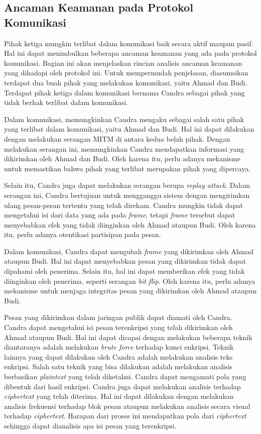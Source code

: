 \subsection{Ancaman Keamanan pada Protokol Komunikasi}
\label{sec:ancaman-keamanan}

Pihak ketiga mungkin terlibat dalam komunikasi baik secara aktif maupun pasif. Hal ini dapat menimbulkan beberapa ancaman keamanan yang ada pada protokol komunikasi. Bagian ini akan menjelaskan rincian analisis ancaman keamanan yang dihadapi oleh protokol ini. Untuk mempermudah penjelasan, diasumsikan terdapat dua buah pihak yang melakukan komunikasi, yaitu Ahmad dan Budi. Terdapat pihak ketiga dalam komunikasi bernama Candra sebagai pihak yang tidak berhak terlibat dalam komunikasi. 

Dalam komunikasi, memungkinkan Candra mengaku sebagai salah satu pihak yang terlibat dalam komunikasi, yaitu Ahmad dan Budi. Hal ini dapat dilakukan dengan melakukan serangan MITM di antara kedua belah pihak. Dengan melakukan serangan ini, memungkinkan Candra mendapatkan informasi yang dikirimkan oleh Ahmad dan Budi. Oleh karena itu, perlu adanya mekanisme untuk memastikan bahwa pihak yang terlibat merupakan pihak yang dipercaya.

Selain itu, Candra juga dapat melakukan serangan berupa \emph{replay attack}. Dalam serangan ini, Candra bertujuan untuk mengganggu sistem dengan mengirimkan ulang pesan-pesan tertentu yang telah direkam. Candra mungkin tidak dapat mengetahui isi dari data yang ada pada \emph{frame}, tetapi \emph{frame} tersebut dapat menyebabkan efek yang tidak diinginkan oleh Ahmad ataupun Budi. Oleh karena itu, perlu adanya otentikasi partisipan pada pesan.

Dalam komunikasi, Candra dapat mengubah \emph{frame} yang dikirimkan oleh Ahmad ataupun Budi. Hal ini dapat menyebabkan pesan yang dikirimkan tidak dapat dipahami oleh penerima. Selain itu, hal ini dapat memberikan efek yang tidak diinginkan oleh penerima, seperti serangan \emph{bit flip}. Oleh karena itu, perlu adanya mekanisme untuk menjaga integritas pesan yang dikirimkan oleh Ahmad ataupun Budi.

Pesan yang dikirimkan dalam jaringan publik dapat diamati oleh Candra. Candra dapat mengetahui isi pesan terenkripsi yang telah dikirimkan oleh Ahmad ataupun Budi. Hal ini dapat dicapai dengan melakukan beberapa teknik diantaranya adalah melakukan \emph{brute force} terhadap kunci enkripsi. Teknik lainnya yang dapat dilakukan oleh Candra adalah melakukan analisis teks enkripsi. Salah satu teknik yang bisa dilakukan adalah melakukan analisis berbasikan \emph{plaintext} yang telah diketahui. Candra dapat mengamati pola yang dibentuk dari hasil enkripsi. Candra juga dapat melakukan analisis terhadap \emph{ciphertext} yang telah diterima. Hal ini dapat dilakukan dengan melakukan analisis frekuensi terhadap blok pesan ataupun melakukan analisis secara visual terhadap \emph{ciphertext}. Harapan dari proses ini mendapatkan pola dari \emph{ciphertext} sehingga dapat dianalisis apa isi pesan yang terenkripsi.

